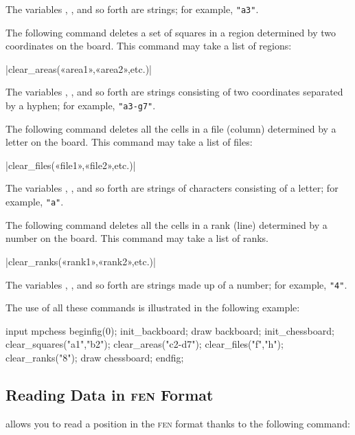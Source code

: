 \documentclass[english]{ltxdoc}
\begin{document}
The variables \textbf{}, \textbf{},
and so forth are strings; for example, \lstinline+"a3"+.
\medskip

The following command deletes a set of squares in a region
determined by two coordinates on the board. This command may take
a list of regions:

\commande|clear_areas(«area1»,«area2»,etc.)|\smallskip

The variables \textbf{}, \textbf{}, and so
forth are strings consisting of two coordinates separated by a hyphen; for example, \lstinline+"a3-g7"+.
\medskip

The following command deletes all the cells in a file (column) determined by a
letter on the board. This command may take a list of files:


\commande|clear_files(«file1»,«file2»,etc.)|\smallskip

The variables \textbf{}, \textbf{}, and so
forth are strings of characters consisting of a letter; for example, \lstinline+"a"+.
\medskip

The following command deletes all the cells in a rank (line) determined by a
number on the board. This command may take a list of ranks.

\commande|clear_ranks(«rank1»,«rank2»,etc.)|\smallskip

The variables \textbf{}, \textbf{}, and so
forth are strings made up of a number; for example, \lstinline+"4"+.

The use of all these commands is illustrated in the following example:

\begin{ExempleMP}
input mpchess
beginfig(0);
init_backboard;
draw backboard;
init_chessboard;
clear_squares("a1","b2");
clear_areas("c2-d7");
clear_files("f","h");
clear_ranks("8");
draw chessboard;
endfig;
\end{ExempleMP}



\subsection{Reading Data in \textsc{fen} Format}

\mpchess allows you to read a position in the \textsc{fen} format thanks to the following command:
\end{document}
